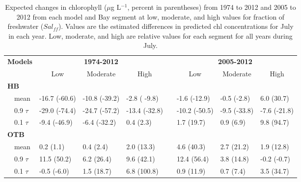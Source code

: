 \documentclass[letterpaper,12pt,oneside]{article}\usepackage[]{graphicx}\usepackage[]{color}
\newcommand{\mugl}{$\mu$g L$^{-1}$}
\begin{document}
%
\begin{table}[!tbp]
\caption{Expected changes in chlorophyll (\mugl, percent in parentheses) from 1974 to 2012 and 2005 to 2012 from each model and Bay segment at low, moderate, and high values for fraction of freshwater ($Sal_{ff}$).  Values are the estimated differences in predicted \ac{chl} concentrations for July in each year.  Low, moderate, and high are relative values for each segment for all years during July.\label{tab:trendest}} 
\begin{center}
\begin{tabular}{llllclll}
\hline\hline
\multicolumn{1}{l}{\bfseries {\bf Models}}&\multicolumn{3}{c}{\bfseries 1974-2012}&\multicolumn{1}{c}{\bfseries }&\multicolumn{3}{c}{\bfseries 2005-2012}\tabularnewline
\cline{2-4} \cline{6-8}
\multicolumn{1}{l}{}&\multicolumn{1}{c}{Low}&\multicolumn{1}{c}{Moderate}&\multicolumn{1}{c}{High}&\multicolumn{1}{c}{}&\multicolumn{1}{c}{Low}&\multicolumn{1}{c}{Moderate}&\multicolumn{1}{c}{High}\tabularnewline
\hline
{\bfseries HB}&&&&&&&\tabularnewline
~~mean&-16.7 {\footnotesize (-60.6)}&-10.8 {\footnotesize (-39.2)}&-2.8 {\footnotesize ( -9.8)}&&-1.6 {\footnotesize (-12.9)}&-0.5 {\footnotesize (-2.8)}&6.0 {\footnotesize (30.7)}\tabularnewline
~~0.9 $\tau$&-29.0 {\footnotesize (-74.4)}&-24.7 {\footnotesize (-57.2)}&-13.4 {\footnotesize (-32.8)}&&-10.2 {\footnotesize (-50.5)}&-9.5 {\footnotesize (-33.8)}&-7.6 {\footnotesize (-21.8)}\tabularnewline
~~0.1 $\tau$&-9.4 {\footnotesize (-46.9)}&-6.4 {\footnotesize (-32.2)}&0.4 {\footnotesize (2.3)}&&1.7 {\footnotesize (19.7)}&0.9 {\footnotesize (6.9)}& 9.8 {\footnotesize (94.7)}\tabularnewline
\hline
{\bfseries OTB}&&&&&&&\tabularnewline
~~mean&0.2 {\footnotesize (1.1)}&0.4 {\footnotesize (2.4)}&2.0 {\footnotesize (13.3)}&&4.6 {\footnotesize (40.3)}&2.7 {\footnotesize (21.2)}&1.9 {\footnotesize (12.8)}\tabularnewline
~~0.9 $\tau$&11.5 {\footnotesize (50.2)}&6.2 {\footnotesize (26.4)}& 9.6 {\footnotesize (42.1)}&&12.4 {\footnotesize (56.4)}&3.8 {\footnotesize (14.8)}&-0.2 {\footnotesize (-0.7)}\tabularnewline
~~0.1 $\tau$&-0.5 {\footnotesize (-6.0)}&1.5 {\footnotesize (18.7)}&6.8 {\footnotesize (100.8)}&&0.9 {\footnotesize (11.9)}&0.7 {\footnotesize (7.4)}&3.5 {\footnotesize (34.7)}\tabularnewline

\end{tabular}
\end{center}
\end{table}
\end{document}
